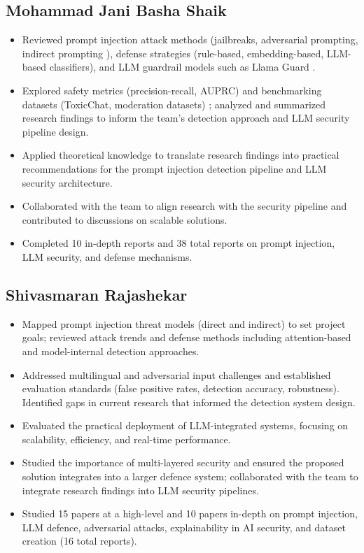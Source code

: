 \documentclass[12pt, letterpaper]{article}   %
\begin{document}
\subsection{Mohammad Jani Basha Shaik}
\begin{itemize}
    \item Reviewed prompt injection attack methods (jailbreaks, adversarial prompting, indirect prompting \cite{ref26}\cite{ref30}), defense strategies (rule-based, embedding-based, LLM-based classifiers), and LLM guardrail models such as Llama Guard \cite{ref31}.
    \item Explored safety metrics (precision-recall, AUPRC) and benchmarking datasets (ToxicChat, moderation datasets) \cite{ref31}\cite{ref3}; analyzed and summarized research findings to inform the team's detection approach and LLM security pipeline design.
    \item Applied theoretical knowledge to translate research findings into practical recommendations for the prompt injection detection pipeline and LLM security architecture.
    \item Collaborated with the team to align research with the security pipeline and contributed to discussions on scalable solutions.
    \item Completed 10 in-depth reports and 38 total reports on prompt injection, LLM security, and defense mechanisms.
\end{itemize}

\subsection{Shivasmaran Rajashekar}
\begin{itemize}
    \item Mapped prompt injection threat models (direct and indirect) to set project goals; reviewed attack trends and defense methods including attention-based \cite{ref10} and model-internal detection approaches.
    \item Addressed multilingual and adversarial input challenges \cite{ref16}\cite{ref27} and established evaluation standards (false positive rates, detection accuracy, robustness). Identified gaps in current research that informed the detection system design.
    \item Evaluated the practical deployment of LLM-integrated systems, focusing on scalability, efficiency, and real-time performance.
    \item Studied the importance of multi-layered security and ensured the proposed solution integrates into a larger defence system; collaborated with the team to integrate research findings into LLM security pipelines.
    \item Studied 15 papers at a high-level and 10 papers in-depth on prompt injection, LLM defence, adversarial attacks, explainability in AI security, and dataset creation (16 total reports).
\end{itemize}
\end{document}
